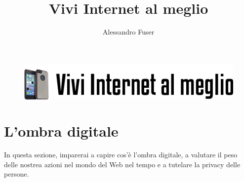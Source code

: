\documentclass{article}
\begin{document}
		\author{Alessandro Fuser}
		\title{Vivi Internet al meglio}
		\maketitle
		\begin{figure}[h!]
			\centering
			\includegraphics[scale=0.8]{logo.png}
		\end{figure}
		
		\pagebreak
		
		\tableofcontents
		
		\pagebreak
		
		\section{L'ombra digitale}
		In questa sezione, imparerai a capire cos'è l'ombra digitale, a valutare il peso delle nostrea azioni nel mondo del Web nel tempo e a tutelare la privacy delle persone.
\end{document}
